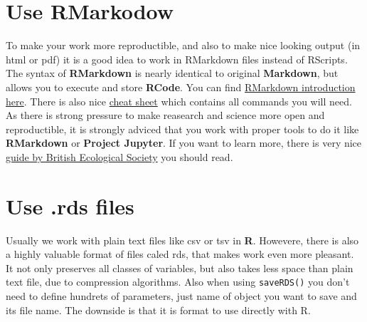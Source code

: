 \documentclass[]{book}
\theoremstyle{definition}
\theoremstyle{definition}
\theoremstyle{definition}
\theoremstyle{remark}
\begin{document}
\section{Use RMarkodow}\label{use-rmarkodow}

To make your work more reproductible, and also to make nice looking
output (in html or pdf) it is a good idea to work in RMarkdown files
instead of RScripts. The syntax of \textbf{RMarkdown} is nearly
identical to original \textbf{Markdown}, but allows you to execute and
store \textbf{RCode}. You can find
\href{http://rmarkdown.rstudio.com/articles_intro.html}{RMarkdown
introduction here}. There is also nice
\href{https://www.rstudio.com/wp-content/uploads/2015/02/rmarkdown-cheatsheet.pdf}{cheat
sheet} which contains all commands you will need. As there is strong
pressure to make reasearch and science more open and reproductible, it
is strongly adviced that you work with proper tools to do it like
\textbf{RMarkdown} or \textbf{Project Jupyter}. If you want to learn
more, there is very nice
\href{https://www.britishecologicalsociety.org/wp-content/uploads/2017/12/guide-to-reproducible-code.pdf}{guide
by British Ecological Society} you should read.

\section{Use .rds files}\label{use-.rds-files}

Usually we work with plain text files like csv or tsv in \textbf{R}.
Howevere, there is also a highly valuable format of files caled rds,
that makes work even more pleasant. It not only preserves all classes of
variables, but also takes less space than plain text file, due to
compression algorithms. Also when using \texttt{saveRDS()} you don't
need to define hundrets of parameters, just name of object you want to
save and its file name. The downside is that it is format to use
directly with R.


\end{document}
